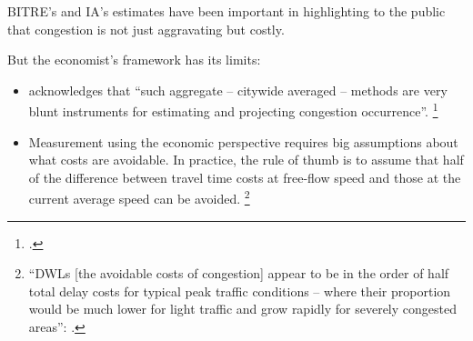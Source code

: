 \documentclass{grattan}
\begin{document}
BITRE's and IA's estimates have been important in highlighting to the public that congestion is not just aggravating but costly.

But the economist's framework has its limits:

\begin{itemize}
\item  \textcite{BITRE-2015-Traffic-and-congestion-cost-trends-for-Aust-capital-cities} acknowledges that ``such aggregate -- citywide averaged -- methods are very blunt instruments for estimating and projecting congestion occurrence''.
    \footcite[][15]{BITRE-2015-Traffic-and-congestion-cost-trends-for-Aust-capital-cities}
\item Measurement using the economic perspective requires big assumptions about what costs are avoidable. In practice, the rule of thumb is to assume that half of the difference between travel time costs at free-flow speed and those at the current average speed can be avoided.%
    \footnote{``DWLs [the avoidable costs of congestion] appear to be in the order of half total delay costs for typical peak traffic conditions -- where their proportion would be much lower for light traffic and grow rapidly for severely congested areas'':
    \textcite[][78]{BITRE-2007-Estimating-urban-traffic-and-congestion-cost-trends}.}

\end{itemize}
\end{document}
